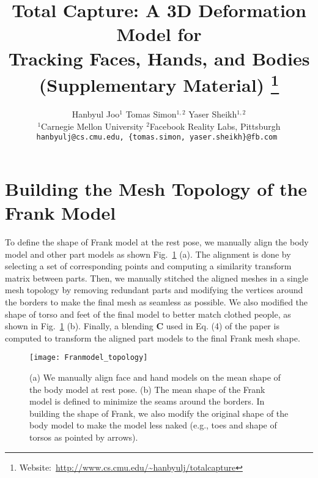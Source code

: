 \documentclass[11pt,english]{article}
\date{\vspace{-5ex}}
\begin{document}
\title{Total Capture: A 3D Deformation Model for \\
Tracking Faces, Hands, and Bodies \\
(Supplementary Material) \thanks{Website:~\scriptsize{\url{http://www.cs.cmu.edu/\~hanbyulj/totalcapture}}}}

\author{Hanbyul Joo$^{1}$ \hspace{0.25in} Tomas Simon$^{1,2}$ \hspace{0.25in} Yaser Sheikh$^{1,2}$\\
	$^{1}$Carnegie Mellon University \hspace{0.25in} $^{2}$Facebook Reality Labs, Pittsburgh  \\
\tt\small hanbyulj@cs.cmu.edu, \{tomas.simon, yaser.sheikh\}@fb.com
}
\maketitle

\section{Building the Mesh Topology of the Frank Model}
To define the shape of Frank model at the rest pose, we manually align the body model and other part models as shown Fig.~\ref{fig:buildingFrank} (a). The alignment is done by selecting a set of corresponding points and computing a similarity transform matrix between parts. Then, we manually stitched the aligned meshes in a single mesh topology by removing redundant parts and modifying the vertices around the borders to make the final mesh as seamless as possible. We also modified the shape of torso and feet of the final model to better match clothed people, as shown in Fig.~\ref{fig:buildingFrank} (b). Finally, a blending $\mathbf{C}$ used in Eq. (4) of the paper is computed to transform the aligned part models to the final Frank mesh shape. 

\begin{figure}[t]
    \centering
    \texttt{[image: Franmodel\_topology]}
    \caption{ (a) We manually align face and hand models on the mean shape of the body model at rest pose. (b) The mean shape of the Frank model is defined to minimize the seams around the borders. In building the shape of Frank, we also modify the original shape of the body model to make the model less naked (e.g., toes and shape of torsos as pointed by arrows).}
    \label{fig:buildingFrank}
\end{figure}
\end{document}
